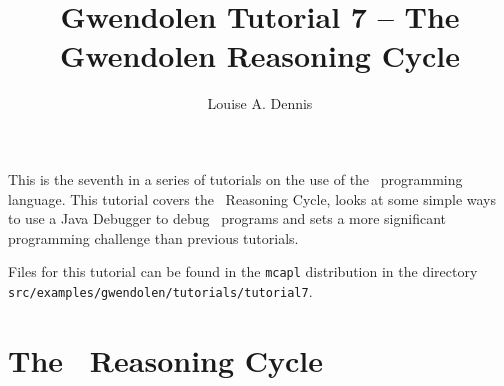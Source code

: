 \documentclass[a4]{article}
\author{Louise A. Dennis}
\title{Gwendolen Tutorial 7 -- The Gwendolen Reasoning Cycle}
\begin{document}
\maketitle
This is the seventh in a series of tutorials on the use of the \gwendolen\ programming language.  This tutorial covers the \gwendolen\ Reasoning Cycle, looks at some simple ways to use a Java Debugger to debug \gwendolen\ programs and sets a more significant programming challenge than previous tutorials.

Files for this tutorial can be found in the \texttt{mcapl} distribution in the directory \texttt{src/examples/gwendolen/tutorials/tutorial7}.

\section{The \gwendolen\ Reasoning Cycle}
\end{document}
